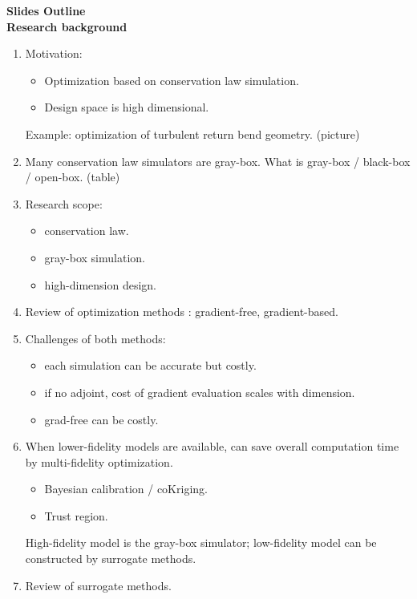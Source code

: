 \documentclass[a4paper,onecolumn]{article}
\theoremstyle{remark}
\begin{document}
\setcounter{page}{1}
\hspace{.36\textwidth}
\Large\textbf{Slides Outline}\\
\normalsize
\textbf{Research background}
\begin{enumerate}
    \item Motivation: 
          \begin{itemize}
              \item Optimization based on conservation law simulation. 
              \item Design space is high dimensional.
          \end{itemize}
          Example: optimization of turbulent return bend geometry. (picture)
    \item Many conservation law simulators are gray-box. What is gray-box / black-box / open-box. (table)
    \item Research scope:
          \begin{itemize}
              \item conservation law.
              \item gray-box simulation.
              \item high-dimension design.
          \end{itemize}
    \item Review of optimization methods : gradient-free, gradient-based.
    \item Challenges of both methods: 
          \begin{itemize}
              \item each simulation can be accurate but costly.
              \item if no adjoint, cost of gradient evaluation scales with dimension.
              \item grad-free can be costly. 
          \end{itemize}
    \item When lower-fidelity models are available, can save overall computation time by multi-fidelity optimization.
          \begin{itemize}
              \item Bayesian calibration / coKriging.
              \item Trust region.
          \end{itemize}
          High-fidelity model is the gray-box simulator; low-fidelity model can be constructed by surrogate methods.
    \item Review of surrogate methods. 

\end{enumerate}
\end{document}

